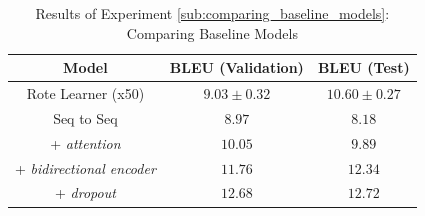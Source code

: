 \begin{table}[!ht]
\begin{center}
\begin{tabular}{ c | c | c }
    Model                             & BLEU (Validation)  & BLEU (Test)    \\
    \hline
    Rote Learner (x50)                & $ 9.03 \pm  0.32 $ & $ 10.60 \pm 0.27 $   \\
    \hline
    Seq to Seq                        & $ 8.97 $ & $ 8.18 $ \\
    + \textit{attention}              & $ 10.05 $ & $ 9.89 $  \\
    + \textit{bidirectional encoder}  & $ 11.76 $ & $ 12.34 $  \\
    + \textit{dropout}                & $ 12.68 $ & $ 12.72 $  \\
    \hline

\end{tabular}
\caption {Results of Experiment \ref{sub:comparing_baseline_models}: Comparing Baseline Models }
\label{table:name_baseline}
\end{center}
\end{table}



